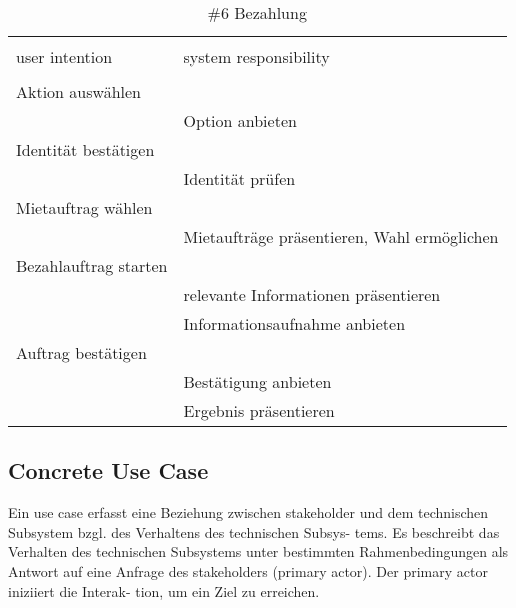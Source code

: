 \begin{table}[H]
\caption{\#6 Bezahlung }
\centering
\begin{tabular}{l l}
\\ [-0.5ex]

\hline\hline
\\ [-0.5ex]
user intention & system responsibility
\\ [1.5ex]
\hline
\\ [-0.5ex]
Aktion auswählen	 		& 											 \\[1ex]
							& Option anbieten							 \\[1ex]
Identität bestätigen		& 											 \\[1ex]
							& Identität prüfen							 \\[1ex]
Mietauftrag wählen		  	& 											 \\[1ex] 
							& Mietaufträge präsentieren, Wahl ermöglichen\\[1ex]
Bezahlauftrag starten		& 											 \\[1ex]
							& relevante Informationen präsentieren		 \\[1ex]
							& Informationsaufnahme anbieten	     		 \\[1ex]
Auftrag bestätigen			&	     									 \\[1ex]
							& Bestätigung anbieten				   		 \\[1ex]
							& Ergebnis präsentieren			    		 \\[1ex]

\hline
\end{tabular}
\label{tab:statuscodes}
\end{table}

\newpage
\subsection{Concrete Use Case}
Ein use case erfasst eine Beziehung zwischen stakeholder und dem technischen Subsystem bzgl. des Verhaltens des technischen Subsys- tems. Es beschreibt das Verhalten des technischen Subsystems unter bestimmten Rahmenbedingungen als Antwort auf eine Anfrage des stakeholders (primary actor). Der primary actor iniziiert die Interak- tion, um ein Ziel zu erreichen.

